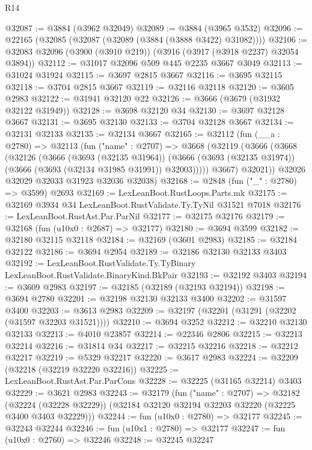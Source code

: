 \begin{lexlean}{R14}
\begin{coremodule}
@32087 := @3884 (@3962 @32049)
@32089 := @3884 (@3965 @3532)
@32096 := @22165 (@32085 (@32087 (@32089 (@3884 (@3888 @3422) @31082))))
@32106 := @32083 @32096 (@3900 (@3910 @219)) (@3916 (@3917 (@3918 @2237) @32054 @3894))
@32112 := @31017 @32096 @509 @445 @2235 @3667 @3049
@32113 := @31024 @31924
@32115 := @3697 @2815 @3667
@32116 := @3695 @32115
@32118 := @3704 @2815 @3667
@32119 := @32116 @32118
@32120 := @3605 @2983
@32122 := @31941 @32120 @22
@32126 := @3666 (@3679 (@31932 @32122 @31949))
@32128 := @3698 @32120 @34
@32130 := @3697 @32128 @3667
@32131 := @3695 @32130
@32133 := @3704 @32128 @3667
@32134 := @32131 @32133
@32135 := @32134 @3667
@32165 := @32112
    (fun (__a : @2780) =>
    @32113
      (fun ("name" : @2707) =>
      @3668
        (@32119
          (@3666
            (@3668
              (@32126
                (@3666
                  (@3693 (@32135 @31964))
                  (@3666 (@3693 (@32135 @31974)) (@3666 (@3693 (@32134 @31985 @31991)) @32003)))))
            @3667)
          @32021))
      @32026
      @32029
      @32033
      @31923
      @32036
      @32038)
@32168 := @2848 (fun ("_" : @2780) => @3599) @2693
@32169 := LexLeanBoot.RustLoops.Parts.mk
@32175 := @32169 @3934 @34 LexLeanBoot.RustValidate.Ty.TyNil @31521 @7018
@32176 := LexLeanBoot.RustAst.Par.ParNil
@32177 := @32175 @32176
@32179 := @32168 (fun (u10x0 : @2687) => @32177)
@32180 := @3694 @3599
@32182 := @32180 @32115 @32118
@32184 := @32169 (@3601 @2983)
@32185 := @32184 @32122
@32186 := @3694 @2954
@32189 := @32186 @32130 @32133 @3403
@32192 := LexLeanBoot.RustValidate.Ty.TyBinary LexLeanBoot.RustValidate.BinaryKind.BkPair
@32193 := @32192 @3403
@32194 := @3609 @2983
@32197 := @32185 (@32189 (@32193 @32194))
@32198 := @3694 @2780
@32201 := @32198 @32130 @32133 @3400
@32202 := @31597 @3400
@32203 := @3613 @2983
@32209 := @32197 (@32201 (@31291 (@32202 (@31597 @32203 @31521))))
@32210 := @3694 @3252
@32212 := @32210 @32130 @32133
@32213 := @4010 @23857
@32214 := @22346 @2806
@32215 := @32213 @32214
@32216 := @31814 @34
@32217 := @32215 @32216
@32218 := @32212 @32217
@32219 := @5329 @32217
@32220 := @3617 @2983
@32224 := @32209 (@32218 (@32219 @32220 @32216))
@32225 := LexLeanBoot.RustAst.Par.ParCons
@32228 := @32225 (@31165 @32214) @3403
@32229 := @3621 @2983
@32243 := @32179
    (fun ("name" : @2707) =>
    @32182
      (@32224 (@32228 @32229))
      (@32184 @32120 @32194 @32203 @32220 (@32225 @3400 @3403 @32229)))
@32244 := fun (u10x0 : @2780) => @32177
@32245 := @32243 @32244
@32246 := fun (u10x1 : @2780) => @32177
@32247 := fun (u10x0 : @2760) => @32246
@32248 := @32245 @32247

\end{coremodule}
\end{lexlean}
